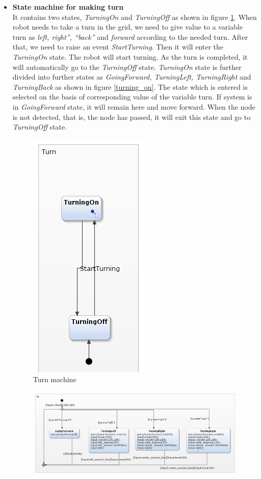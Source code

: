 \documentclass[a4paper,12pt,oneside]{book}
\begin{document}
\begin{itemize}
\item \textbf{State machine for making turn}\\
It contains two states, \textit{TurningOn} and \textit{TurningOff} as shown in figure \ref{turn}. When robot needs to take a turn in the grid, we need to give value to a variable turn as \textit{left, right”, “back”} and \textit{forward} according to the needed turn. After that, we need to raise an event \textit{StartTurning}. Then it will enter the \textit{TurningOn} state. The robot will start turning. As the turn is completed, it will automatically go to the \textit{TurningOff} state.
\textit{TurningOn} state is further divided into further states as \textit{GoingForward, TurningLeft, TurningRight} and \textit{TurningBack} as shown in figure \ref{turning_on}.
The state which is entered is selected on the basis of corresponding value of the variable turn.
If system is in \textit{GoingForward} state, it will remain here and move forward. When the node is not detected, that is, the node has passed, it will exit this state and go to \textit{TurningOff} state.
	\begin{figure}[!htbp]
	\centering
	\includegraphics[scale=.6]{turn.png}
	\caption{Turn machine}
	\label{turn}
\end{figure}
\begin{figure}[!htbp]
	\centering
	\includegraphics[scale=.65]{turning_on.png}

\end{figure}
\end{itemize}
\end{document}
